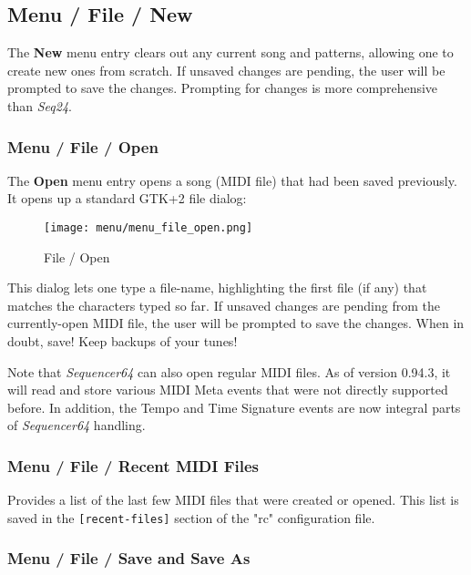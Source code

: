 \subsection{Menu / File / New}
\label{subsec:menu_file_new}

   The \textbf{New} menu entry clears out any current song and patterns,
   allowing one to create new ones from scratch.
   If unsaved changes are pending, the user will be prompted to save the
   changes.  Prompting for changes is more comprehensive than \textsl{Seq24}.

\subsubsection{Menu / File / Open}
\label{subsubsec:seq64_menu_file_open}

   The \textbf{Open} menu entry opens a song (MIDI file)
   that had been saved previously.  It opens up a standard GTK+2 file dialog:

\begin{figure}[H]
   \centering 
   \texttt{[image: menu/menu\_file\_open.png]}
   \caption{File / Open}
   \label{fig:seq64_menu_file_open}
\end{figure}

   This dialog lets one type a file-name, highlighting the first file (if any)
   that matches the characters typed so far.
   If unsaved changes are pending from the currently-open MIDI file,
   the user will be prompted to save the changes.
   When in doubt, save!  Keep backups of your tunes!

   Note that \textsl{Sequencer64} can also open regular MIDI files.
   As of version 0.94.3, it will read and store various MIDI Meta events that
   were not directly supported before.  In addition, the Tempo and Time
   Signature events are now integral parts of \textsl{Sequencer64} handling.

\subsubsection{Menu / File / Recent MIDI Files}
\label{subsubsec:seq64_menu_file_recent}

   Provides a list of the last few MIDI files that were created or opened.
   This list is saved in the \texttt{[recent-files]} section of the
   "rc" configuration file.

\subsubsection{Menu / File / Save and Save As}
\label{subsubsec:menu_file_open_save_as}


